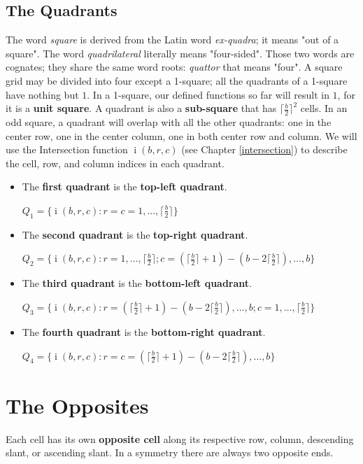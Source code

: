 \documentclass[twoside,openany,12pt]{book}
\begin{document}
    \section{The Quadrants} \label{quadrant}
    The word \textit{square} is derived from the Latin word \textit{ex-quadra}; it means "out of a square". The word \textit{quadrilateral} literally means "four-sided". Those two words are cognates; they share the same word roots: \textit{quattor} that means "four". A square grid may be divided into four except a 1-square; all the quadrants of a 1-square have nothing but $1$. In a 1-square, our defined functions so far will result in $1$, for it is a \textbf{unit square}. A quadrant is also a \textbf{sub-square} that has $\lceil\frac{b}{2}\rceil^2$ cells. In an odd square, a quadrant will overlap with all the other quadrants: one in the center row, one in the center column, one in both center row and column. We will use the Intersection function $\operatorname{i}(b,r,c)$ (see Chapter \ref{intersection}) to describe the cell, row, and column indices in each quadrant.
    \begin{itemize}
      \item The \textbf{first quadrant} is the \textbf{top-left quadrant}.
        
        $Q_1 = \{ \operatorname{i}(b,r,c) : r=c=1,\dots,\lceil\frac{b}{2}\rceil \}$
      \item The \textbf{second quadrant} is the \textbf{top-right quadrant}.
        
        $Q_2 = \{ \operatorname{i}(b,r,c) : r=1,\dots,\lceil\frac{b}{2}\rceil; c=(\lceil\frac{b}{2}\rceil +1)-(b - 2\lceil\frac{b}{2}\rceil ),\dots,b\}$

      \item The \textbf{third quadrant} is the \textbf{bottom-left quadrant}.
        
        $Q_3 = \{ \operatorname{i}(b,r,c) :  r=(\lceil\frac{b}{2}\rceil +1)-(b - 2\lceil\frac{b}{2}\rceil ),\dots,b; c=1,\dots,\lceil\frac{b}{2}\rceil\}$
      \item The \textbf{fourth quadrant} is the \textbf{bottom-right quadrant}.
        
        $Q_4 = \{ \operatorname{i}(b,r,c) :  r=c=(\lceil\frac{b}{2}\rceil +1)-(b - 2\lceil\frac{b}{2}\rceil ),\dots,b\}$
    \end{itemize}

    \newpage

    \chapter{The Opposites}
    Each cell has its own \textbf{opposite cell} along its respective row, column, descending slant, or ascending slant. In a symmetry there are always two opposite ends.
\end{document}
